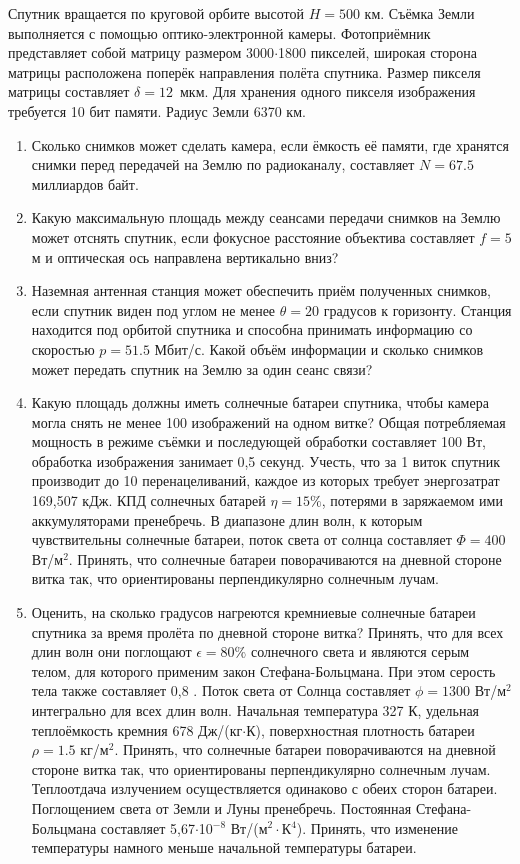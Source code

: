 
Спутник вращается по круговой орбите высотой $H=500$ км. Съёмка Земли выполняется с помощью оптико-электронной 
камеры. Фотоприёмник представляет собой матрицу размером 3000$\cdot$1800 пикселей, широкая сторона матрицы 
расположена поперёк направления полёта спутника. Размер пикселя матрицы составляет $\delta=12$~мкм. Для хранения 
одного пикселя изображения требуется 10 бит памяти. Радиус Земли 6370 км.

\begin{enumerate}
    \item Сколько снимков может сделать камера, если ёмкость её памяти, где хранятся снимки перед передачей на 
    Землю по радиоканалу,  составляет $N=67.5$ миллиардов байт.
    \item Какую максимальную площадь между сеансами передачи снимков на Землю может отснять спутник, если 
    фокусное расстояние объектива составляет \linebreak $f=5$ м и оптическая ось направлена вертикально вниз?
    \item Наземная антенная станция может обеспечить приём полученных снимков, если спутник виден под углом не 
    менее $\theta=20$ градусов к горизонту. Станция находится под орбитой спутника и способна принимать информацию 
    со скоростью $p=51.5$ Мбит/с. Какой объём информации и сколько снимков может передать спутник на Землю за 
    один сеанс связи? 
    \item Какую площадь должны иметь солнечные батареи спутника, чтобы камера могла снять не менее 100 
    изображений на одном витке? Общая потребляемая мощность в режиме съёмки и последующей обработки составляет 
    100 Вт, обработка изображения занимает 0,5 секунд. Учесть, что за 1 виток спутник производит до 10 
    перенацеливаний, каждое из которых требует энергозатрат 169,507 кДж. КПД солнечных батарей $\eta=15\%$, 
    потерями в заряжаемом ими аккумуляторами пренебречь. В диапазоне длин волн, к которым чувствительны солнечные 
    батареи, поток света от солнца составляет $\Phi=400$ Вт/м$^2$. Принять, что солнечные батареи поворачиваются на 
    дневной стороне витка так, что ориентированы перпендикулярно солнечным лучам.
    \item Оценить, на сколько градусов нагреются кремниевые солнечные батареи спутника за время пролёта по 
    дневной стороне витка? Принять, что для всех длин волн они поглощают $\epsilon=80\%$ солнечного света и 
    являются серым телом, для которого применим закон Стефана-Больцмана. При этом серость тела также составляет 
    0,8 . Поток света от Солнца составляет $\phi=1300$ Вт/м$^2$  интегрально для всех длин волн. Начальная 
    температура 327 К, удельная теплоёмкость кремния 678 Дж/(кг$\cdot$К), поверхностная плотность батареи $\rho=1.5$ кг/м$^2$. 
    Принять, что солнечные батареи поворачиваются на дневной стороне витка так, что ориентированы перпендикулярно 
    солнечным лучам. Теплоотдача излучением осуществляется одинаково с обеих сторон батареи. Поглощением света 
    от Земли и Луны пренебречь. Постоянная Стефана-Больцмана составляет 5,67$\cdot$10$^{-8}$ Вт/(м$^2\cdot$К$^4$). 
    Принять, что изменение температуры намного меньше начальной температуры батареи.
\end{enumerate}